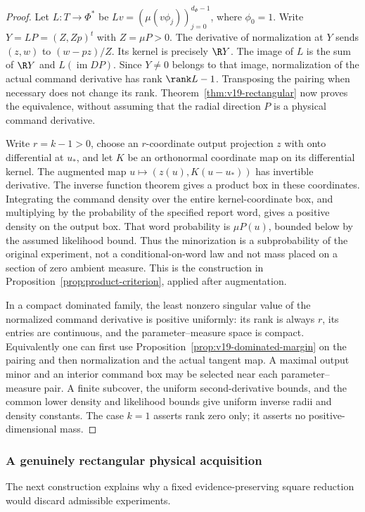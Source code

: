 \begin{proof}
Let $L:T\to\Phi^*$ be $Lv=(\mu(v\phi_j))_{j=0}^{d_\Phi-1}$,
where $\phi_0=1$. Write $Y=LP=(Z,Zp)^t$ with $Z=\mu P>0$.
The derivative of normalization at $Y$ sends
$(z,w)$ to $(w-pz)/Z$. Its kernel is precisely $\R Y$.
The image of $L$ is the sum of $\R Y$ and $L(\operatorname{im}DP)$.
Since $Y\ne0$ belongs to that image, normalization of the actual
command derivative has rank $\rank L-1$. Transposing the pairing
when necessary does not change its rank. Theorem~\ref{thm:v19-rectangular}
now proves the equivalence, without assuming that the radial direction
$P$ is a physical command derivative.

Write $r=k-1>0$, choose an $r$-coordinate output projection $z$ with
onto differential at $u_*$, and let $K$ be an orthonormal coordinate
map on its differential kernel. The augmented map
$u\mapsto(z(u),K(u-u_*))$ has invertible derivative. The inverse
function theorem gives a product box in these coordinates. Integrating
the command density over the entire kernel-coordinate box, and
multiplying by the probability of the specified report word, gives a
positive density on the output box. That word probability is
$\mu P(u)$, bounded below by the assumed likelihood bound. Thus the
minorization is a subprobability of the original experiment, not a
conditional-on-word law and not mass placed on a section of zero
ambient measure. This is the construction in
Proposition~\ref{prop:product-criterion}, applied after augmentation.

In a compact dominated family, the least nonzero singular value of
the normalized command derivative is positive uniformly: its rank is
always $r$, its entries are continuous, and the parameter--measure
space is compact. Equivalently one can first use
Proposition~\ref{prop:v19-dominated-margin} on the pairing and then
normalization and the actual tangent map. A maximal output minor and
an interior command box may be selected near each parameter--measure
pair. A finite subcover, the uniform second-derivative bounds, and the
common lower density and likelihood bounds give uniform inverse
radii and density constants. The case $k=1$ asserts rank zero only;
it asserts no positive-dimensional mass.
\end{proof}

\subsubsection{A genuinely rectangular physical acquisition}
The next construction explains why a fixed evidence-preserving square
reduction would discard admissible experiments.

